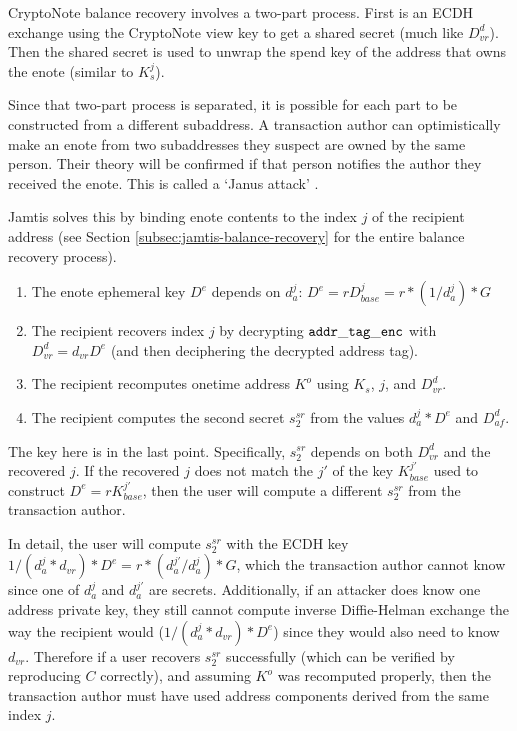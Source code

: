 CryptoNote balance recovery involves a two-part process. First is an ECDH exchange using the CryptoNote view key to get a shared secret (much like $D^d_{vr}$). Then the shared secret is used to unwrap the spend key of the address that owns the enote (similar to $K^j_s$).

Since that two-part process is separated, it is possible for each part to be constructed from a different subaddress. A transaction author can optimistically make an enote from two subaddresses they suspect are owned by the same person. Their theory will be confirmed if that person notifies the author they received the enote. This is called a `Janus attack' \cite{janus-attack}.

Jamtis solves this by binding enote contents to the index $j$ of the recipient address (see Section \ref{subsec:jamtis-balance-recovery} for the entire balance recovery process).
\begin{enumerate}
    \item The enote ephemeral key $D^e$ depends on $d^j_a$: $D^e = r D^j_{base} = r*(1 / d^j_a)*G$

    \item The recipient recovers index $j$ by decrypting ${\tt addr\_tag\_enc}$ with $D^d_{vr} = d_{vr} D^e$ (and then deciphering the decrypted address tag).

    \item The recipient recomputes onetime address $K^o$ using $K_s$, $j$, and $D^d_{vr}$.

    \item The recipient computes the second secret $s^{sr}_2$ from the values $d^j_a * D^e$ and $D^d_{af}$.
\end{enumerate}

The key here is in the last point. Specifically, $s^{sr}_2$ depends on both $D^d_{vr}$ and the recovered $j$. If the recovered $j$ does not match the $j'$ of the key $K^{j'}_{base}$ used to construct $D^e = r K^{j'}_{base}$, then the user will compute a different $s^{sr}_2$ from the transaction author.

In detail, the user will compute $s^{sr}_2$ with the ECDH key $1/(d^j_a * d_{vr}) * D^e = r * (d^{j'}_a/d^{j}_a) * G$, which the transaction author cannot know since one of $d^{j}_a$ and $d^{j'}_a$ are secrets. Additionally, if an attacker does know one address private key, they still cannot compute inverse Diffie-Helman exchange the way the recipient would ($1/(d^j_a * d_{vr}) * D^e$) since they would also need to know $d_{vr}$. Therefore if a user recovers $s^{sr}_2$ successfully (which can be verified by reproducing $C$ correctly), and assuming $K^o$ was recomputed properly, then the transaction author must have used address components derived from the same index $j$.

